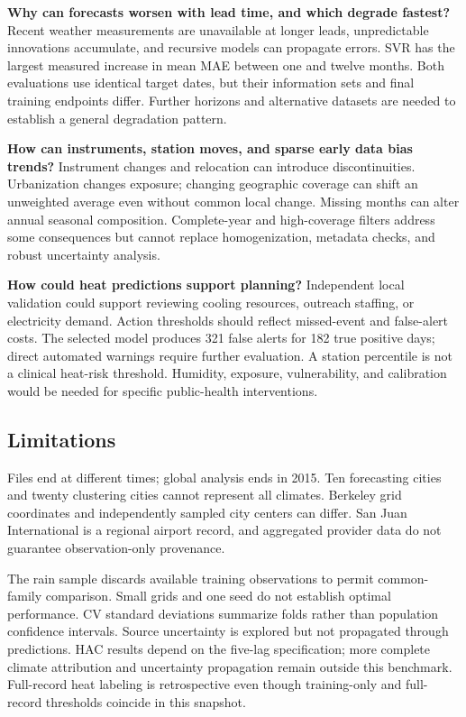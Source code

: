 \documentclass[conference]{IEEEtran}
\begin{document}
\textbf{Why can forecasts worsen with lead time, and which degrade fastest?} Recent weather measurements are unavailable at longer leads, unpredictable innovations accumulate, and recursive models can propagate errors. SVR has the largest measured increase in mean MAE between one and twelve months. Both evaluations use identical target dates, but their information sets and final training endpoints differ. Further horizons and alternative datasets are needed to establish a general degradation pattern.

\textbf{How can instruments, station moves, and sparse early data bias trends?} Instrument changes and relocation can introduce discontinuities. Urbanization changes exposure; changing geographic coverage can shift an unweighted average even without common local change. Missing months can alter annual seasonal composition. Complete-year and high-coverage filters address some consequences but cannot replace homogenization, metadata checks, and robust uncertainty analysis.

\textbf{How could heat predictions support planning?} Independent local validation could support reviewing cooling resources, outreach staffing, or electricity demand. Action thresholds should reflect missed-event and false-alert costs. The selected model produces 321 false alerts for 182 true positive days; direct automated warnings require further evaluation. A station percentile is not a clinical heat-risk threshold. Humidity, exposure, vulnerability, and calibration would be needed for specific public-health interventions.

\subsection{Limitations}
Files end at different times; global analysis ends in 2015. Ten forecasting cities and twenty clustering cities cannot represent all climates. Berkeley grid coordinates and independently sampled city centers can differ. San Juan International is a regional airport record, and aggregated provider data do not guarantee observation-only provenance.

The rain sample discards available training observations to permit common-family comparison. Small grids and one seed do not establish optimal performance. CV standard deviations summarize folds rather than population confidence intervals. Source uncertainty is explored but not propagated through predictions. HAC results depend on the five-lag specification; more complete climate attribution and uncertainty propagation remain outside this benchmark. Full-record heat labeling is retrospective even though training-only and full-record thresholds coincide in this snapshot.
\end{document}
